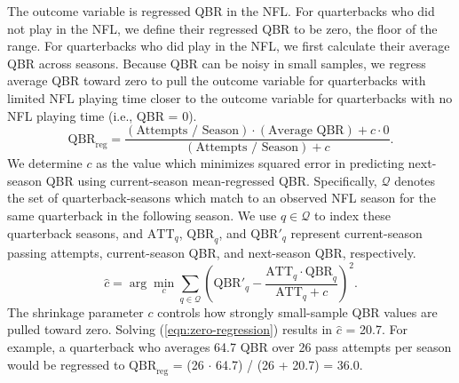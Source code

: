 \documentclass[Review, sageh, times, doublespace]{sagej}
\begin{document}
  \begin{table}
    \small
    \centering
    
    \caption{
      \it Summary statistics for the 17 features in the random forest. Variable names prefixed with ``Final'' refer to the player's final collegiate season. Final Heisman Voting is the player's rank in the Heisman voting, with 11 representing that the player did not appear in the top 10.
    }
    \label{tab:feature-list}
  \end{table}

The outcome variable is regressed QBR in the NFL. For quarterbacks who did not play in the NFL, we define their regressed QBR to be zero, the floor of the range. For quarterbacks who did play in the NFL, we first calculate their average QBR across seasons. Because QBR can be noisy in small samples, we regress average QBR toward zero to pull the outcome variable for quarterbacks with limited NFL playing time closer to the outcome variable for quarterbacks with no NFL playing time (i.e., QBR = 0).
\begin{equation*}
  \mbox{QBR}_{\mbox{reg}} = \frac{(\mbox{Attempts / Season}) \cdot (\mbox{Average QBR}) + c \cdot 0}{(\mbox{Attempts / Season}) + c}.
\end{equation*}
We determine $c$ as the value which minimizes squared error in predicting next-season QBR using current-season mean-regressed QBR. Specifically, $\mathcal{Q}$ denotes the set of quarterback-seasons which match to an observed NFL season for the same quarterback in the following season. We use $q \in \mathcal{Q}$ to index these quarterback seasons, and $\text{ATT}_q$, $\text{QBR}_q$, and $\text{QBR}'_q$ represent current-season passing attempts, current-season QBR, and next-season QBR, respectively.
\begin{equation}
  \label{eqn:zero-regression}
  \hat{c}
  =
  \arg\min_{c}
  \sum_{q \in \mathcal{Q}}
  \left(
    \text{QBR}'_q
    -
    \frac{\text{ATT}_q \cdot \text{QBR}_q}
         {\text{ATT}_q + c}
  \right)^2 .
\end{equation}
The shrinkage parameter $c$ controls how strongly small-sample QBR values are pulled toward zero. Solving (\ref{eqn:zero-regression}) results in $\hat c$ = 20.7. For example, a quarterback who averages 64.7 QBR over 26 pass attempts per season would be regressed to $\text{QBR}_{\text{reg}}$ = (26 $\cdot$ 64.7) / (26 + 20.7) = 36.0.
\end{document}
